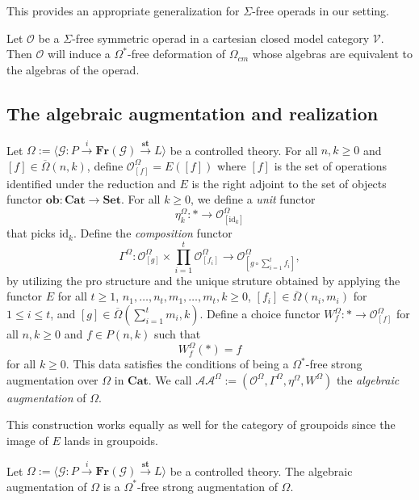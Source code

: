 \documentclass{tac}
\begin{document}
This provides an appropriate generalization for $\Sigma$-free operads in our setting.

\begin{example}
Let $\mathcal{O}$ be a $\Sigma$-free symmetric operad in a cartesian closed model category $\mathcal{V}$. Then $\mathcal{O}$ will induce a $\Omega^*$-free deformation of $\Omega_{cm}$ whose algebras are equivalent to the algebras of the operad.
\end{example}


\subsection*{The algebraic augmentation and realization}

\begin{construction}\label{constr_of_algebraic_aug}
Let $\Omega:=\langle \mathcal{G}:P\xrightarrow{i}\mathbf{Fr}(\mathcal{G})\xrightarrow{\mathbf{st}}L\rangle$ be a controlled theory. For all $n,k\geq 0$ and $[f]\in\overline{\Omega}(n,k)$, define $\mathcal{O}^\Omega_{[f]}=E([f])$ where $[f]$ is the set of operations identified under the reduction and $E$ is the right adjoint to the set of objects functor $\mathbf{ob}:\mathbf{Cat}\to\mathbf{Set}$. For all $k\geq 0$, we define a \emph{unit} functor 
\[
\eta_k^{\Omega}:*\to \mathcal{O}^\Omega_{[\text{id}_k]}
\]
that picks $\text{id}_k$. Define the \emph{composition} functor 
    \[
\Gamma^\Omega:\mathcal{O}^\Omega_{[g]}\times\prod_{i=1}^t\mathcal{O}^\Omega_{[f_i]}\to\mathcal{O}^\Omega_{[g\circ\sum_{i=1}^tf_i]},
    \]
    by utilizing the pro structure and the unique struture obtained by applying the functor $E$ for all $t\geq 1$, $n_1,\dots,n_t,m_1,\dots,m_t,k\geq 0$, $[f_i]\in\overline{\Omega}(n_i,m_i)$ for $1\leq i\leq t$, and $[g]\in\overline{\Omega}(\sum_{i=1}^tm_i,k)$. Define a choice functor $W^\Omega_f:*\to \mathcal{O}^\Omega_{[f]}$ for all $n,k\geq 0$ and $f\in P(n,k)$ such that 
    \[
    W^\Omega_{f}(*)=f
    \]
    for all $k\geq 0$.
This data satisfies the conditions of being a $\Omega^*$-free strong augmentation over $\Omega$ in $\mathbf{Cat}$. We call $\mathcal{AA}^\Omega:=(\mathcal{O}^\Omega,\Gamma^\Omega,\eta^\Omega,W^\Omega)$ the \emph{algebraic augmentation} of $\Omega$.
 \end{construction}

 This construction works equally as well for the category of groupoids since the image of $E$ lands in groupoids.

 \begin{theorem}\label{proof_of_freeness_of_alg_aug}
Let $\Omega:=\langle \mathcal{G}:P\xrightarrow{i}\mathbf{Fr}(\mathcal{G})\xrightarrow{\mathbf{st}}L\rangle$ be a controlled theory. The algebraic augmentation of $\Omega$ is a $\Omega^*$-free strong augmentation of $\Omega$.
 \end{theorem}
\end{document}
